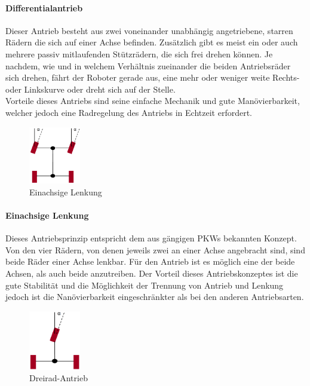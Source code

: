 \paragraph{Differentialantrieb}
\color{process}
Dieser Antrieb besteht aus zwei voneinander unabhängig angetriebene, starren Rädern die sich auf einer Achse befinden. Zusätzlich gibt es meist ein oder auch mehrere passiv mitlaufenden Stützrädern, die sich frei drehen können. Je nachdem, wie und in welchem Verhältnis zueinander die beiden Antriebsräder sich drehen, fährt der Roboter gerade aus, eine mehr oder weniger weite Rechts- oder Linkskurve oder dreht sich auf der Stelle.\\
Vorteile dieses Antriebs sind seine einfache Mechanik und gute Manövierbarkeit, welcher jedoch eine Radregelung des Antriebs in Echtzeit erfordert.
\begin{figure}
	\vspace{-0.25cm}
	\begin{center}
		\includegraphics[width=0.20\textwidth]{images/technische_grundlagen/Einachsenlenkung.png}
	\end{center}
	\caption{Einachsige Lenkung}
	\label{fig:einachsenlenkung}
\end{figure}
\paragraph{Einachsige Lenkung}
\color{process}
Dieses Antriebsprinzip entspricht dem aus gängigen PKWs bekannten Konzept. Von den vier Rädern, von denen jeweils zwei an einer Achse angebracht sind, sind beide Räder einer Achse lenkbar. Für den Antrieb ist es möglich eine der beide Achsen, als auch beide anzutreiben. 
\newline
Der Vorteil dieses Antriebskonzeptes ist die gute Stabilität und die Möglichkeit der Trennung von Antrieb und Lenkung jedoch ist die Nanövierbarkeit eingeschränkter als bei den anderen Antriebsarten.
\begin{figure}
	\vspace{+0.25cm}
	\begin{center}
		\includegraphics[width=0.20\textwidth]{images/technische_grundlagen/Dreiradantrieb.png}
	\end{center}
	\caption{Dreirad-Antrieb}
	\label{fig:einachsenlenkung}
\end{figure}
